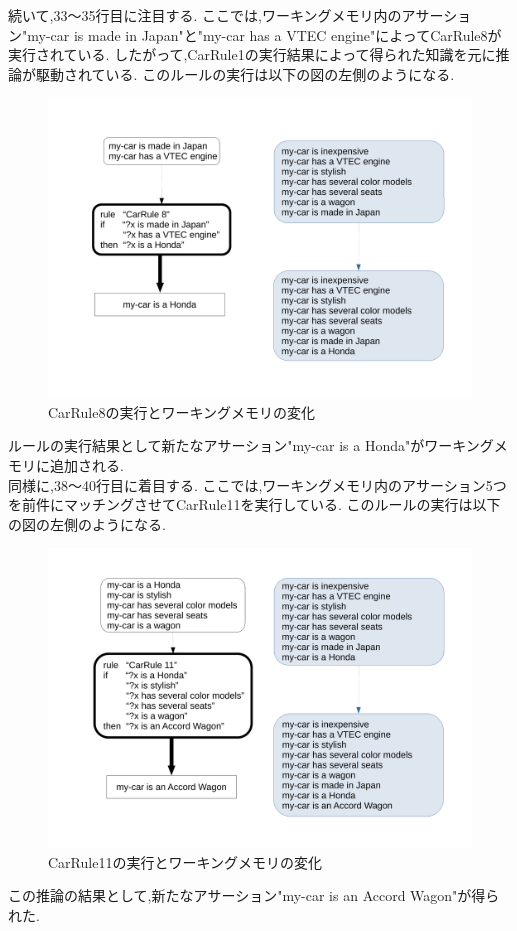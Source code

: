 \documentclass[uplatex,12pt]{jsarticle}
\begin{document}
続いて,33〜35行目に注目する.
ここでは,ワーキングメモリ内のアサーション"my-car is made in Japan"と"my-car has a VTEC engine"によってCarRule8が実行されている.
したがって,CarRule1の実行結果によって得られた知識を元に推論が駆動されている.
このルールの実行は以下の図の左側のようになる. \\
\begin{figure}[!hbt]
    \centering
    \includegraphics[scale=0.40]{images/forward_chaining_2.pdf}
    \caption{CarRule8の実行とワーキングメモリの変化}
\end{figure}
\newpage
ルールの実行結果として新たなアサーション"my-car is a Honda"がワーキングメモリに追加される. \\

同様に,38〜40行目に着目する.
ここでは,ワーキングメモリ内のアサーション5つを前件にマッチングさせてCarRule11を実行している.
このルールの実行は以下の図の左側のようになる.
\begin{figure}[!hbt]
    \centering
    \includegraphics[scale=0.40]{images/forward_chaining_3.pdf}
    \caption{CarRule11の実行とワーキングメモリの変化}
\end{figure}
\newpage
この推論の結果として,新たなアサーション"my-car is an Accord Wagon"が得られた. \\
\end{document}
